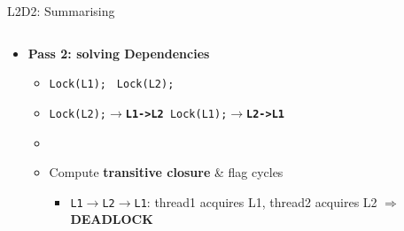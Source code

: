 \documentclass[10pt, usenames, dvipsnames, aspectratio=169]{beamer}
\newcommand\tab[1][1cm]{\hspace*{#1}}
\begin{document}
\begin{frame}{L2D2: Summarising}
\begin{columns}
\begin{column}{0.95 \textwidth}
\begin{itemize}
                \item
                    \large{\textbf{Pass 2: solving Dependencies}} \\
                    \begin{itemize}
                        \item[]
                            \large{\textcolor{thread1}{\texttt{Lock(L1);}\tab\tab[1.2cm] \textcolor{thread2}{\texttt{ Lock(L2);}}}}

                        \item[]
                            \textcolor{thread1}{\texttt{Lock(L2);$\rightarrow$\textbf{L1->L2}}\quad\textcolor{thread2}{\texttt{ Lock(L1);$\rightarrow$\textbf{L2->L1}}}}

                        \item[]
                            \normalsize
                            \item Compute \alert{\textbf{transitive closure}} \& flag cycles \\
                            \begin{itemize}
                                \normalsize

                                \item[]
                                    \texttt{L1$\rightarrow$L2$\rightarrow$L1}: \textcolor{thread1}{thread1} acquires L1, \textcolor{thread2}{thread2} acquires L2 $\Rightarrow$ \alert{\textbf{\large{DEADLOCK}}}
                            \end{itemize}
                    \end{itemize}
            \end{itemize}
        \end{column}
    \end{columns}
\end{frame}
\end{document}
